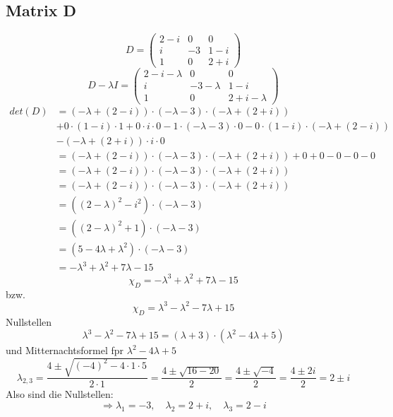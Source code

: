 \documentclass{article} %
\begin{document}
\subsection*{Matrix D}
\[
D = \begin{pmatrix}
2-i&0&0\\
i&-3&1-i\\
1&0&2+i
\end{pmatrix}
\]
\[
D - \lambda I = \begin{pmatrix}
2-i- \lambda&0&0\\
i&-3- \lambda&1-i\\
1&0&2+i- \lambda
\end{pmatrix}
\]
\begin{align*}
    det(D) & = (-\lambda+(2-i))\cdot(-\lambda-3)\cdot(-\lambda+(2+i)) \\
    & +0\cdot(1-i)\cdot1+0\cdot i\cdot0-1\cdot(-\lambda-3)\cdot0-0\cdot(1-i)\cdot(-\lambda+(2-i)) \\
    & -(-\lambda+(2+i))\cdot i\cdot0 \\
   & = (-\lambda+(2-i))\cdot(-\lambda-3)\cdot(-\lambda+(2+i)) +0+0-0-0 -0 \\
   & = (-\lambda+(2-i))\cdot(-\lambda-3)\cdot(-\lambda+(2+i))\\
      & = (-\lambda+(2-i))\cdot(-\lambda-3)\cdot(-\lambda+(2+i))\\
      & = ((2-\lambda)^2 - i^2) \cdot (-\lambda-3) \\
      & = ((2-\lambda)^2 +1) \cdot (-\lambda-3) \\
    & = (5-4\lambda+ \lambda^2) \cdot (-\lambda-3) \\
    & = -\lambda^3 + \lambda^2 + 7\lambda -15 
\end{align*}
\[
\chi_D = -\lambda^3 + \lambda^2 + 7\lambda -15 
\]
bzw. 
\[
\chi_D = \lambda^3 - \lambda^2 - 7\lambda +15 
\]
Nullstellen
\[
\lambda^3 - \lambda^2 - 7\lambda +15  = (\lambda +3) \cdot (\lambda^2 - 4 \lambda +5)
\]
und Mitternachtsformel fpr $\lambda^2 - 4 \lambda +5$
\[
\lambda_{2,3} = \frac{4 \pm \sqrt{(-4)^2 - 4 \cdot 1 \cdot 5 }}{2 \cdot 1} = \frac{4 \pm \sqrt{16 -20} }{2} = \frac{4 \pm \sqrt{-4}}{2} = \frac{4 \pm 2i}{2} = 2 \pm i
\]
Also sind die Nullstellen: 
\[
\Rightarrow \lambda_1 = -3, \quad \lambda_2 = 2+i, \quad \lambda_3 = 2-i
\]
\end{document}
